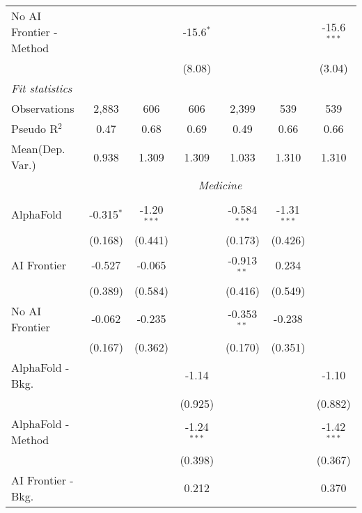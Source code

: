 \begin{tabular}{lcccccc}
   No AI Frontier - Method &               &              & -15.6$^{*}$  &               &             & -15.6$^{***}$\\   
                           &               &              & (8.08)       &               &             & (3.04)\\   
   \midrule
   \emph{Fit statistics}\\
   Observations            & 2,883         & 606          & 606          & 2,399         & 539         & 539\\  
   Pseudo R$^2$            & 0.47          & 0.68         & 0.69         & 0.49          & 0.66        & 0.66\\  
   
Mean(Dep. Var.) & 0.938 & 1.309 & 1.309 & 1.033 & 1.310 & 1.310 \\
 & \multicolumn{6}{c}{\textit{Medicine}} \\ \\
   AlphaFold               & -0.315$^{*}$ & -1.20$^{***}$ &               & -0.584$^{***}$ & -1.31$^{***}$ &   \\   
                           & (0.168)      & (0.441)       &               & (0.173)        & (0.426)       &   \\   
   AI Frontier             & -0.527       & -0.065        &               & -0.913$^{**}$  & 0.234         &   \\   
                           & (0.389)      & (0.584)       &               & (0.416)        & (0.549)       &   \\   
   No AI Frontier          & -0.062       & -0.235        &               & -0.353$^{**}$  & -0.238        &   \\   
                           & (0.167)      & (0.362)       &               & (0.170)        & (0.351)       &   \\   
   AlphaFold - Bkg.        &              &               & -1.14         &                &               & -1.10\\   
                           &              &               & (0.925)       &                &               & (0.882)\\   
   AlphaFold - Method      &              &               & -1.24$^{***}$ &                &               & -1.42$^{***}$\\   
                           &              &               & (0.398)       &                &               & (0.367)\\   
   AI Frontier - Bkg.      &              &               & 0.212         &                &               & 0.370\\   

\end{tabular}
